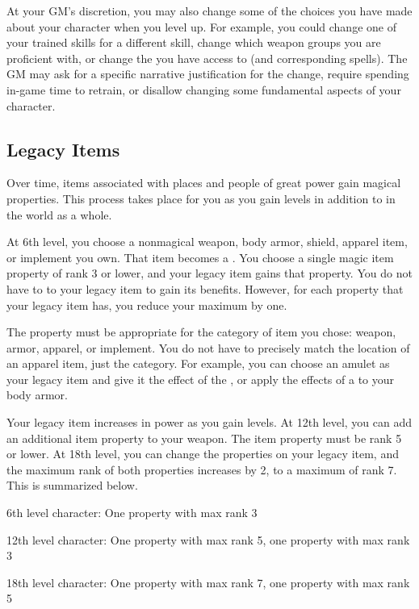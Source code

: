     At your GM's discretion, you may also change some of the choices you have made about your character when you level up.
    For example, you could change one of your trained skills for a different skill, change which weapon groups you are proficient with, or change the  you have access to (and corresponding spells).
    The GM may ask for a specific narrative justification for the change, require spending in-game time to retrain, or disallow changing some fundamental aspects of your character.

    \subsection{Legacy Items}\label{Legacy Items}

        Over time, items associated with places and people of great power gain magical properties.
        This process takes place for you as you gain levels in addition to in the world as a whole.

        At 6th level, you choose a nonmagical weapon, body armor, shield, apparel item, or implement you own.
        That item becomes a .
        You choose a single magic item property of rank 3 or lower, and your legacy item gains that property.
        You do not have to  to your legacy item to gain its benefits.
        However, for each  property that your legacy item has, you reduce your maximum  by one.

        The property must be appropriate for the category of item you chose: weapon, armor, apparel, or implement.
        You do not have to precisely match the location of an apparel item, just the category.
        For example, you can choose an amulet as your legacy item and give it the effect of the , or apply the effects of a  to your body armor.

        Your legacy item increases in power as you gain levels.
        At 12th level, you can add an additional item property to your weapon.
        The item property must be rank 5 or lower.
        At 18th level, you can change the properties on your legacy item, and the maximum rank of both properties increases by 2, to a maximum of rank 7.
        This is summarized below.
        \begin{raggeditemize}
            \item 6th level character: One property with max rank 3
            \item 12th level character: One property with max rank 5, one property with max rank 3
            \item 18th level character: One property with max rank 7, one property with max rank 5
        \end{raggeditemize}

